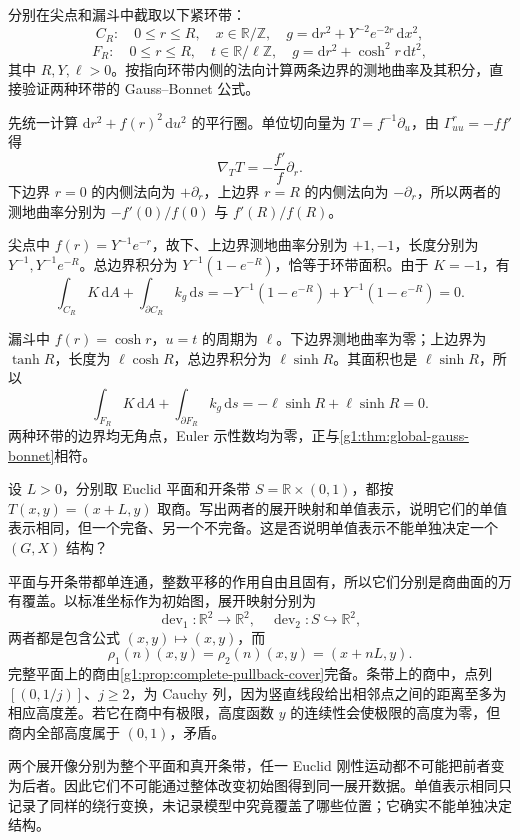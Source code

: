 \begin{exercise}\label{g1:ex:cusp-funnel-boundary-curvature}
	分别在尖点和漏斗中截取以下紧环带：
	\[
		C_R:\quad 0\le r\le R,\quad x\in\mathbb R/\mathbb Z,
		\quad g=\mathrm{d}r^2+Y^{-2}e^{-2r}\,\mathrm{d}x^2,
	\]
	\[
		F_R:\quad 0\le r\le R,\quad t\in\mathbb R/\ell\mathbb Z,
		\quad g=\mathrm{d}r^2+\cosh^2r\,\mathrm{d}t^2,
	\]
	其中 \(R,Y,\ell>0\)。按指向环带内侧的法向计算两条边界的测地曲率及其积分，直接验证两种环带的 Gauss--Bonnet 公式。
\end{exercise}
\begin{solution}
	先统一计算 \(\mathrm{d}r^2+f(r)^2\,\mathrm{d}u^2\) 的平行圈。单位切向量为 \(T=f^{-1}\partial_u\)，由 \(\Gamma^r_{uu}=-ff'\) 得
	\[
		\nabla_TT=-\frac{f'}f\partial_r.
	\]
	下边界 \(r=0\) 的内侧法向为 \(+\partial_r\)，上边界 \(r=R\) 的内侧法向为 \(-\partial_r\)，所以两者的测地曲率分别为 \(-f'(0)/f(0)\) 与 \(f'(R)/f(R)\)。

	尖点中 \(f(r)=Y^{-1}e^{-r}\)，故下、上边界测地曲率分别为 \(+1,-1\)，长度分别为 \(Y^{-1},Y^{-1}e^{-R}\)。总边界积分为 \(Y^{-1}(1-e^{-R})\)，恰等于环带面积。由于 \(K=-1\)，有
	\[
		\int_{C_R}K\,\mathrm{d}A+\int_{\partial C_R}k_g\,\mathrm{d}s
		=-Y^{-1}(1-e^{-R})+Y^{-1}(1-e^{-R})=0.
	\]

	漏斗中 \(f(r)=\cosh r\)，\(u=t\) 的周期为 \(\ell\)。下边界测地曲率为零；上边界为 \(\tanh R\)，长度为 \(\ell\cosh R\)，总边界积分为 \(\ell\sinh R\)。其面积也是 \(\ell\sinh R\)，所以
	\[
		\int_{F_R}K\,\mathrm{d}A+\int_{\partial F_R}k_g\,\mathrm{d}s
		=-\ell\sinh R+\ell\sinh R=0.
	\]
	两种环带的边界均无角点，Euler 示性数均为零，正与\cref{g1:thm:global-gauss-bonnet}相符。
\end{solution}

\begin{exercise}
	\label{g1:ex:strip-cylinder-development}
	设 \(L>0\)，分别取 Euclid 平面和开条带 \(S=\mathbb R\times(0,1)\)，都按 \(T(x,y)=(x+L,y)\) 取商。写出两者的展开映射和单值表示，说明它们的单值表示相同，但一个完备、另一个不完备。这是否说明单值表示不能单独决定一个 \((G,X)\) 结构？
\end{exercise}
\begin{solution}
	平面与开条带都单连通，整数平移的作用自由且固有，所以它们分别是商曲面的万有覆盖。以标准坐标作为初始图，展开映射分别为
	\[
		\operatorname{dev}_1:\mathbb R^2\to\mathbb R^2,\quad
		\operatorname{dev}_2:S\hookrightarrow\mathbb R^2,
	\]
	两者都是包含公式 \((x,y)\mapsto(x,y)\)，而
	\[
		\rho_1(n)(x,y)=\rho_2(n)(x,y)=(x+nL,y).
	\]
	完整平面上的商由\cref{g1:prop:complete-pullback-cover}完备。条带上的商中，点列 \([(0,1/j)]\)、\(j\ge2\)，为 Cauchy 列，因为竖直线段给出相邻点之间的距离至多为相应高度差。若它在商中有极限，高度函数 \(y\) 的连续性会使极限的高度为零，但商内全部高度属于 \((0,1)\)，矛盾。

	两个展开像分别为整个平面和真开条带，任一 Euclid 刚性运动都不可能把前者变为后者。因此它们不可能通过整体改变初始图得到同一展开数据。单值表示相同只记录了同样的绕行变换，未记录模型中究竟覆盖了哪些位置；它确实不能单独决定结构。
\end{solution}

